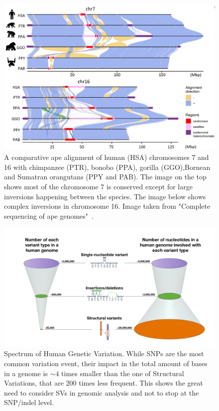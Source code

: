 \begin{figure}[h!]
	\centering
	\includegraphics[width=\linewidth]{figures/background/genome_diff.png}
	\caption[Genomic difference in chromosome 7 and 16 of 5 primate species.]{A comparative ape alignment of human (HSA) chromosomes 7 and 16 with chimpanzee (PTR), bonobo (PPA), gorilla (GGO),Bornean and Sumatran orangutans (PPY and PAB). The image on the top shows most of the chromosome 7 is conserved except for large inversions happening between the species. The image below shows complex inversions in chromosome 16. Image taken from "Complete sequencing of ape genomes"~\cite{ape_genomes}.}
	\label{fig:chromosome_diff}
\end{figure}

\begin{figure}[h!]\clearpage
	\centering
	\includegraphics[width=.95\linewidth]{figures/background/genomic_spectrum.png}
	\caption[Spectrum of Human Genetic Variation.]{Spectrum of Human Genetic Variation. While SNPs are the most common variation event, their impact in the total amount of bases in a genome is $\sim4$ times smaller than the one of Structural Variations, that are 200 times less frequent. This shows the great need to consider SVs in genomic analysis and not to stop at the SNP/indel level.\\}
	\label{fig:variation_spectrum}
\end{figure}


